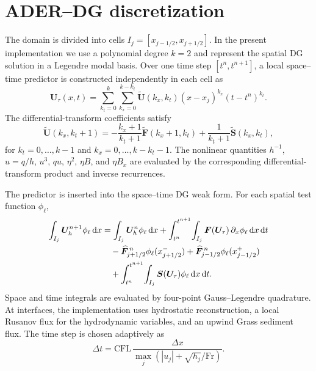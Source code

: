 \documentclass[11pt]{article}
\newcommand{\dd}{\,\mathrm{d}}
\newcommand{\Fr}{\mathrm{Fr}}
\begin{document}
\section{ADER--DG discretization}

The domain is divided into cells $I_j=[x_{j-1/2},x_{j+1/2}]$. In the present implementation we use a polynomial degree $k=2$ and represent the spatial DG solution in a Legendre modal basis. Over one time step $[t^n,t^{n+1}]$, a local space--time predictor is constructed independently in each cell as
\begin{equation}
    \bm U_\tau(x,t)
    =
    \sum_{k_t=0}^{k}\sum_{k_x=0}^{k-k_t}
    \widetilde{\bm U}(k_x,k_t)
    (x-x_j)^{k_x}(t-t^n)^{k_t}.
    \label{eq:predictor}
\end{equation}
The differential-transform coefficients satisfy
\begin{equation}
    \widetilde{\bm U}(k_x,k_t+1)
    =
    -\frac{k_x+1}{k_t+1}\widetilde{\bm F}(k_x+1,k_t)
    +\frac{1}{k_t+1}\widetilde{\bm S}(k_x,k_t),
    \label{eq:dt-recurrence}
\end{equation}
for $k_t=0,\ldots,k-1$ and $k_x=0,\ldots,k-k_t-1$. The nonlinear quantities $h^{-1}$, $u=q/h$, $u^3$, $qu$, $\eta^2$, $\eta B$, and $\eta B_x$ are evaluated by the corresponding differential-transform product and inverse recurrences.

The predictor is inserted into the space--time DG weak form. For each spatial test function $\phi_\ell$,
\begin{align}
    \int_{I_j}\bm U_h^{n+1}\phi_\ell\dd x
    &=
    \int_{I_j}\bm U_h^{n}\phi_\ell\dd x
    +\int_{t^n}^{t^{n+1}}\!\int_{I_j}
      \bm F(\bm U_\tau)\,\partial_x\phi_\ell\dd x\dd t
    \notag\\
    &\quad
    -\widehat{\bm F}_{j+1/2}^{\,n}\phi_\ell(x_{j+1/2}^{-})
    +\widehat{\bm F}_{j-1/2}^{\,n}\phi_\ell(x_{j-1/2}^{+})
    \notag\\
    &\quad
    +\int_{t^n}^{t^{n+1}}\!\int_{I_j}
      \bm S(\bm U_\tau)\phi_\ell\dd x\dd t.
    \label{eq:dg-update}
\end{align}
Space and time integrals are evaluated by four-point Gauss--Legendre quadrature. At interfaces, the implementation uses hydrostatic reconstruction, a local Rusanov flux for the hydrodynamic variables, and an upwind Grass sediment flux. The time step is chosen adaptively as
\begin{equation}
    \Delta t
    =\mathrm{CFL}\,
      \frac{\Delta x}
      {\max_j\left(|u_j|+\sqrt{h_j}/\Fr\right)}.
    \label{eq:cfl}
\end{equation}
\end{document}
